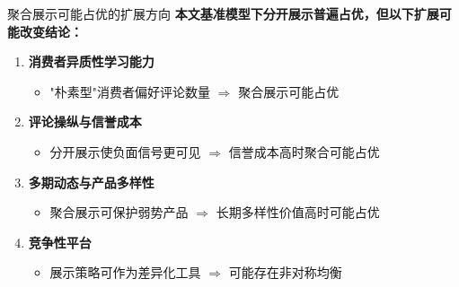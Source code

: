 \documentclass[aspectratio=169,10pt]{beamer}
\begin{document}
\begin{frame}{聚合展示可能占优的扩展方向}
\textbf{本文基准模型下分开展示普遍占优，但以下扩展可能改变结论：}

\vspace{6pt}
\begin{enumerate}
    \item \textbf{消费者异质性学习能力}
    \begin{itemize}
        \item "朴素型"消费者偏好评论数量 $\Rightarrow$ 聚合展示可能占优
    \end{itemize}

    \vspace{4pt}
    \item \textbf{评论操纵与信誉成本}
    \begin{itemize}
        \item 分开展示使负面信号更可见 $\Rightarrow$ 信誉成本高时聚合可能占优
    \end{itemize}

    \vspace{4pt}
    \item \textbf{多期动态与产品多样性}
    \begin{itemize}
        \item 聚合展示可保护弱势产品 $\Rightarrow$ 长期多样性价值高时可能占优
    \end{itemize}

    \vspace{4pt}
    \item \textbf{竞争性平台}
    \begin{itemize}
        \item 展示策略可作为差异化工具 $\Rightarrow$ 可能存在非对称均衡
    \end{itemize}
\end{enumerate}
\end{frame}
\end{document}
